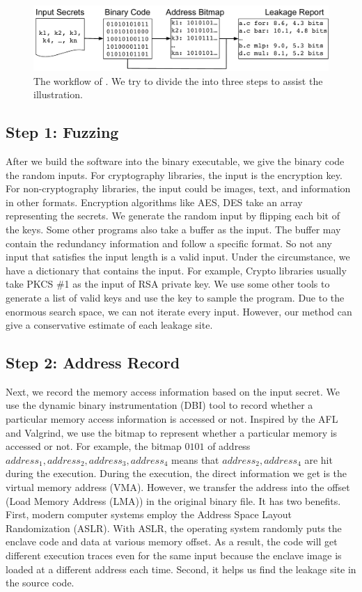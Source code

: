 \begin{figure}[ht]
  \centering
  \includegraphics[width=\columnwidth]{./figures/chapter5/workflow.pdf}
  \caption{The workflow of \ctool{}. We try to divide the \ctool{} into three steps to assist the illustration. }\label{chapter5:fig:workflow}
\end{figure}

\subsection{Step 1: Fuzzing}
After we build the software into the binary executable, we give the binary code the random inputs. For cryptography libraries, the input is the encryption key. For non-cryptography libraries, the input could be images, text, and information in other formats. Encryption algorithms like AES, DES take an array representing the secrets. We generate the random input by flipping each bit of the keys. Some other programs also take a buffer as the input. The buffer may contain the redundancy information and follow a specific format. So not any input that satisfies the input length is a valid input. Under the circumstance, we have a dictionary that contains the input. For example, Crypto libraries usually take PKCS \#1 as the input of RSA private key. We use some other tools to generate a list of valid keys and use the key to sample the program. Due to the enormous search space, we can not iterate every input. However, our method can give a conservative estimate of each leakage site.
\subsection{Step 2: Address Record}
Next, we record the memory access information based on the input secret. We use the dynamic binary instrumentation (DBI) tool to record whether a particular memory access information is accessed or not. Inspired by the AFL and Valgrind, we use the bitmap to represent whether a particular memory is accessed or not. For example, the bitmap ${0101}$ of address $address_1, address_2, address_3, address_4$ means that $address_2, address_4$ are hit during the execution. During the execution, the direct information we get is the virtual memory address (VMA). However, we transfer the address into the offset (Load Memory Address (LMA)) in the original binary file. It has two benefits. First, modern computer systems employ the Address Space Layout Randomization (ASLR). With ASLR, the operating system randomly puts the enclave code and data at various memory offset. As a result, the code will get different execution traces even for the same input because the enclave image is loaded at a different address each time. Second, it helps us find the leakage site in the source code.


